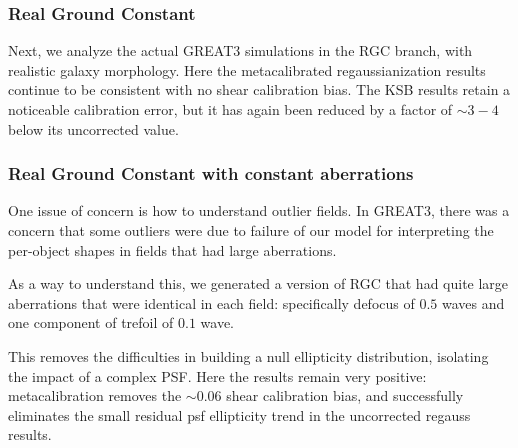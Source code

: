\documentclass[iop]{emulateapj}
\begin{document}
\subsubsection{Real Ground Constant}

Next, we analyze the actual GREAT3 simulations in the RGC branch, with
realistic galaxy morphology. Here the metacalibrated regaussianization
results continue to be consistent with no shear calibration bias. The
KSB results retain a noticeable calibration error, but it has again
been reduced by a factor of $\sim3-4$ below its uncorrected value. 



\subsubsection{Real Ground Constant with constant aberrations}

One issue of concern is how to understand outlier fields.  In GREAT3,
there was a concern that some outliers were due to failure of our
model for interpreting the per-object shapes in fields that had large
aberrations.

As a way to understand this, we generated a version of RGC that had
quite large aberrations that were identical in each field:
specifically defocus of $0.5$ waves and one component of trefoil of
$0.1$ wave.

This removes the difficulties in building a null ellipticity
distribution, isolating the impact of a complex PSF. Here the results
remain very positive: metacalibration removes the $\sim0.06$ shear
calibration bias, and successfully eliminates the small residual psf
ellipticity trend in the uncorrected regauss results.
\end{document}
